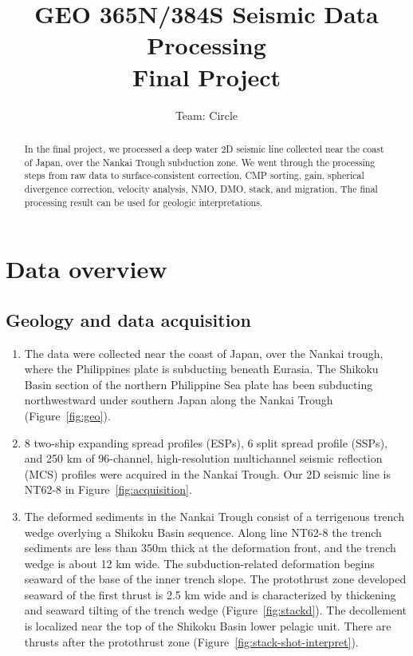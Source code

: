 \author{Team: Circle}
\title{GEO 365N/384S Seismic Data Processing \\ Final Project}

\begin{abstract}

In the final project, we processed a deep water 2D seismic line collected near the coast of Japan, over the Nankai Trough subduction zone. We went through the processing steps from raw data to surface-consistent correction, CMP sorting, gain, spherical divergence correction, velocity analysis, NMO, DMO, stack, and migration. The final processing result can be used for geologic interpretations.
  
\end{abstract}

\section{Data overview}

\subsection{Geology and data acquisition}

\begin{enumerate}

\item The data were collected near the coast of Japan, over the Nankai trough, where the Philippines plate is subducting beneath Eurasia. The Shikoku Basin section of the northern Philippine Sea plate has been subducting northwestward under southern Japan along the Nankai Trough (Figure~\ref{fig:geo}).

\item 8 two-ship expanding spread profiles (ESPs), 6 split spread profile (SSPs), and 250 km of 96-channel, high-resolution multichannel seismic reflection (MCS) profiles were acquired in the Nankai Trough. Our 2D seismic line is NT62-8 in Figure~\ref{fig:acquisition}.

\item The deformed sediments in the Nankai Trough consist of a terrigenous trench wedge overlying a Shikoku Basin sequence. Along line NT62-8 the trench sediments are less than 350m thick at the deformation front, and the trench wedge is about 12 km wide. The subduction-related deformation begins seaward of the base of the inner trench slope. The protothrust zone developed seaward of the first thrust is 2.5 km wide and is characterized by thickening and seaward tilting of the trench wedge (Figure~\ref{fig:stackd}). The decollement is localized near the top of the Shikoku Basin lower pelagic unit. There are thrusts after the protothrust zone (Figure~\ref{fig:stack-shot-interpret}).    


\end{enumerate}\clearpage

